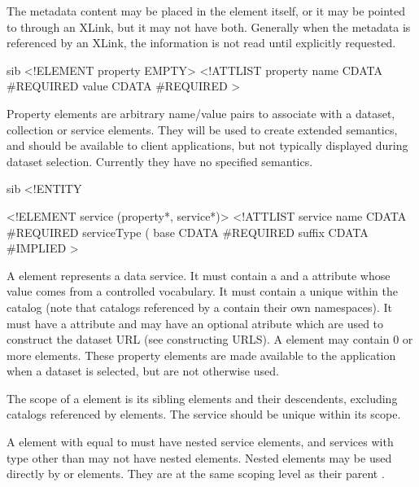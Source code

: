 The metadata content may be placed in the  element
itself, or it may be pointed to through an XLink, but it may not have
both. Generally when the metadata is referenced by an XLink, the
information is not read until explicitly requested.



\begin{vcode}{sib}
<!ELEMENT property EMPTY>
<!ATTLIST property
   name CDATA #REQUIRED
   value CDATA #REQUIRED
>
\end{vcode}

Property elements are arbitrary name/value pairs to associate with a
dataset, collection or service elements. They will be used to create
extended semantics, and should be available to client applications,
but not typically displayed during dataset selection. Currently they
have no specified semantics.


\begin{vcode}{sib}
<!ENTITY %

<!ELEMENT service (property*, service*)>
<!ATTLIST service
    name CDATA #REQUIRED
    serviceType (%
    base CDATA #REQUIRED
    suffix CDATA #IMPLIED
>
\end{vcode}


A  element represents a data service. It must contain
a  and a  attribute whose value comes from
a controlled vocabulary. It must contain a  unique within
the catalog (note that catalogs referenced by a 
contain their own  namespaces). It must have a 
attribute and may have an optional  atribute which are
used to construct the dataset URL (see constructing URLS). A
 element may contain 0 or more 
elements. These property elements are made available to the
application when a dataset is selected, but are not otherwise used.

The scope of a  element is its sibling elements and
their descendents, excluding catalogs referenced by
 elements.  The service  should be
unique within its scope.

A  element with  equal to
 must have nested service elements, and services with
type other than  may not have nested 
elements. Nested  elements may be used directly by
 or  elements. They are at the same
scoping level as their parent .


